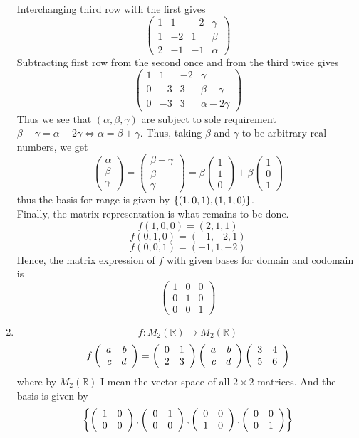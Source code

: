 \documentclass[12pt,fleqn]{article} %
\begin{document}
\begin{enumerate}
	Interchanging third row with the first gives
	\[\left(\begin{array}{rrr|r}1&1&-2&\gamma\\1&-2&1&\beta\\2&-1&-1&\alpha\end{array}\right)\]
	Subtracting first row from the second once and from the third twice gives
	\[\left(\begin{array}{rrr|r}1&1&-2&\gamma\\0&-3&3&\beta-\gamma\\0&-3&3&\alpha-2\gamma\end{array}\right)\]
	Thus we see that $(\alpha,\beta,\gamma)$ are subject to sole requirement $\beta-\gamma=\alpha-2\gamma\iff
	\alpha=\beta+\gamma$. Thus, taking $\beta$ and $\gamma$ to be arbitrary real numbers, we get
	\[\begin{pmatrix}\alpha\\\beta\\\gamma\end{pmatrix}=\begin{pmatrix}\beta+\gamma\\\beta\\\gamma\end{pmatrix}=
		\beta\begin{pmatrix}1\\1\\0\end{pmatrix}+\beta\begin{pmatrix}1\\0\\1\end{pmatrix}\]
	thus the basis for range is given by $\left\{(1,0,1),(1,1,0)\right\}$.\\
	Finally, the matrix representation is what remains to be done.
	\[f(1,0,0)=(2,1,1)\]
	\[f(0,1,0)=(-1,-2,1)\]
	\[f(0,0,1)=(-1,1,-2)\]
	Hence, the matrix expression of $f$ with given bases for domain and codomain is
	\[\left(\begin{array}{rrr}1&0&0\\0&1&0\\0&0&1\end{array}\right)\]
\item \[f:M_2(\mathbb{R})\to M_2(\mathbb{R})\]
	\[f\left(\begin{array}{rr}a&b\\c&d\end{array}\right)=\left(\begin{array}{rr}0&1\\2&3\end{array}\right)\left(\begin{array}{rr}a&b\\c&d\end{array}\right)\left(\begin{array}{rr}3&4\\5&6\end{array}\right)\]
	where by $M_2(\mathbb{R})$ I mean the vector space of all $2\times2$ matrices. And the basis is given by
	\[\left\{\left(\begin{array}{rr}1&0\\0&0\end{array}\right),\left(\begin{array}{rr}0&1\\0&0\end{array}\right),\left(\begin{array}{rr}0&0\\1&0\end{array}\right),\left(\begin{array}{rr}0&0\\0&1\end{array}\right)\right\}\]

\end{enumerate}
\end{document}
